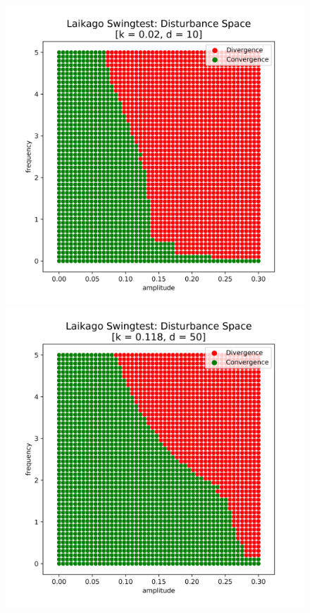     \begin{figure}[h]
        \centering
        \begin{minipage}{0.33\textwidth}
            \centering
            \includegraphics[width=\textwidth]{figures/swingtest_ds_bad.png} %
        \end{minipage}\hfill
        \begin{minipage}{0.33\textwidth}
            \centering
            \includegraphics[width=\textwidth]{figures/swingtest_ds_medium.png} %

\end{minipage}
\end{figure}
